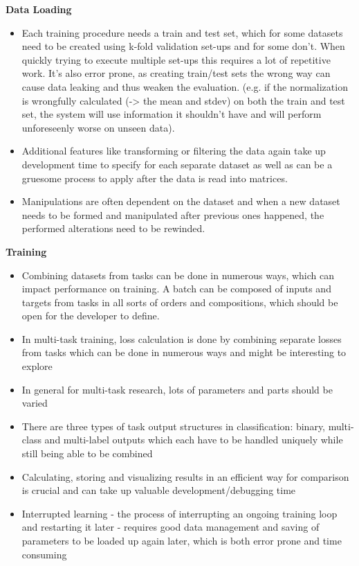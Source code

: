 \textbf{Data Loading}
\begin{itemize}
	\item Each training procedure needs a train and test set, which for some datasets need to be created using k-fold validation set-ups and for some don't. When quickly trying to execute multiple set-ups this requires a lot of repetitive work. It's also error prone, as creating train/test sets the wrong way can cause data leaking and thus weaken the evaluation. (e.g. if the normalization is wrongfully calculated (-> the mean and stdev) on both the train and test set, the system will use information it shouldn't have and will perform unforeseenly worse on unseen data). 
	\item Additional features like transforming or filtering the data again take up development time to specify for each separate dataset as well as can be a gruesome process to apply after the data is read into matrices. 
	\item Manipulations are often dependent on the dataset and when a new dataset needs to be formed and manipulated after previous ones happened, the performed alterations need to be rewinded.
\end{itemize}

\textbf{Training}
\begin{itemize}
	\item Combining datasets from tasks can be done in numerous ways, which can impact performance on training. A batch can be composed of inputs and targets from tasks in all sorts of orders and compositions, which should be open for the developer to define.
	\item In multi-task training, loss calculation is done by combining separate losses from tasks which can be done in numerous ways and might be interesting to explore 
	\item In general for multi-task research, lots of parameters and parts should be varied 
	\item There are three types of task output structures in classification: binary, multi-class and multi-label outputs which each have to be handled uniquely while still being able to be combined 
	\item Calculating, storing and visualizing results in an efficient way for comparison is crucial and can take up valuable development/debugging time 
	\item Interrupted learning - the process of interrupting an ongoing training loop and restarting it later - requires good data management and saving of parameters to be loaded up again later, which is both error prone and time consuming 
\end{itemize}

